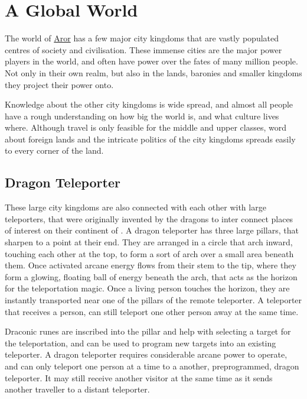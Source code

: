 \section{A Global World}

The world of \hyperref[sec:Aror]{Aror} has a few major city kingdoms that are
vastly populated centres of society and civilisation. These immense cities are
the major power players in the world, and often have power over the fates of
many million people. Not only in their own realm, but also in the lands,
baronies and smaller kingdoms they project their power onto.

Knowledge about the other city kingdoms is wide spread, and almost all people
have a rough understanding on how big the world is, and what culture lives
where. Although travel is only feasible for the middle and upper classes, word
about foreign lands and the intricate politics of the city kingdoms spreads
easily to every corner of the land.

\subsection{Dragon Teleporter}
\label{sec:Dragon Teleporter}

These large city kingdoms are also connected with each other with large
teleporters, that were originally invented by the dragons to inter connect
places of interest on their continent of . A dragon
teleporter has three large pillars, that sharpen to a point at their end. They
are arranged in a circle that arch inward, touching each other at the top, to
form a sort of arch over a small area beneath them. Once activated arcane
energy flows from their stem to the tip, where they form a glowing, floating
ball of energy beneath the arch, that acts as the horizon for the
teleportation magic. Once a living person touches the horizon, they are
instantly transported near one of the pillars of the remote teleporter. A
teleporter that receives a person, can still teleport one other person away at
the same time.

Draconic runes are inscribed into the pillar and help with selecting a target
for the teleportation, and can be used to program new targets into an existing
teleporter. A dragon teleporter requires considerable arcane power to operate,
and can only teleport one person at a time to a another, preprogrammed, dragon
teleporter. It may still receive another visitor at the same time as it sends
another traveller to a distant teleporter.

